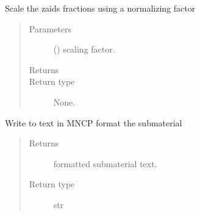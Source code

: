 \documentclass[letterpaper,10pt,english]{sphinxmanual}
\begin{document}
\begin{fulllineitems}
\begin{fulllineitems}
\begin{quote}
\begin{description}
\begin{itemize}
\end{itemize}


\end{description}\end{quote}

\end{fulllineitems}


\begin{fulllineitems}
\label{\detokenize{api/inputgeneration:matreader.SubMaterial.scale_fractions}}
\sphinxAtStartPar
Scale the zaids fractions using a normalizing factor
\begin{quote}\begin{description}
\item[{Parameters}] \leavevmode
\sphinxAtStartPar
{} () \textendash{} scaling factor.

\item[{Returns}] \leavevmode
\sphinxAtStartPar


\item[{Return type}] \leavevmode
\sphinxAtStartPar
None.

\end{description}\end{quote}

\end{fulllineitems}


\begin{fulllineitems}
\label{\detokenize{api/inputgeneration:matreader.SubMaterial.to_text}}
\sphinxAtStartPar
Write to text in MNCP format the submaterial
\begin{quote}\begin{description}
\item[{Returns}] \leavevmode
\sphinxAtStartPar
formatted submaterial text.

\item[{Return type}] \leavevmode
\sphinxAtStartPar
str

\end{description}\end{quote}


\end{fulllineitems}
\end{fulllineitems}
\end{document}
